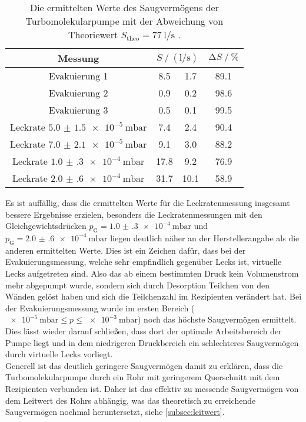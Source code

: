 \begin{table}
    \centering
    \caption{Die ermittelten Werte des Saugvermögens der Turbomolekularpumpe mit der Abweichung von Theoriewert $S_\text{theo} = \SI{77}{\litre\per\second}$ \cite{anleitung}.}
    \label{tab:compare_turbo}
    \begin{tabular}{c  S @{${}\pm{}$} S  S}
        \toprule
        {Messung} &  & {$\increment S  \mathbin{/} \si{\percent}$} \\ 
        \midrule
        Evakuierung 1                           & 8.5 & 1.7 & 89.1\\
        Evakuierung 2                           & 0.9 & 0.2 & 98.6\\
        Evakuierung 3                           & 0.5 & 0.1 & 99.5\\
        Leckrate $\SI{5.0(15)e-5}{\milli\bar}$  & 7.4 & 2.4 & 90.4\\
        Leckrate $\SI{7.0(21)e-5}{\milli\bar}$  & 9.1 & 3.0 & 88.2\\
        Leckrate $\SI{1.0(3)e-4}{\milli\bar}$   &17.8 & 9.2 & 76.9\\
        Leckrate $\SI{2.0(6)e-4}{\milli\bar}$   &31.7 &10.1 & 58.9\\
        \bottomrule
    \end{tabular}
\end{table}

\noindent Es ist auffällig, dass die ermittelten Werte für die Leckratenmessung insgesamt bessere Ergebnisse erzielen, besonders die Leckratenmessungen
mit den Gleichgewichtsdrücken $p_\text{G} = \SI{1.0(3)e-4}{\milli\bar}$ und $p_\text{G} = \SI{2.0(6)e-4}{\milli\bar}$ liegen deutlich näher an der Herstellerangabe als die anderen ermittelten Werte. 
Dies ist ein Zeichen dafür, dass bei der Evakuierungsmessung, welche sehr empfindlich gegenüber Lecks ist, virtuelle Lecks aufgetreten sind. Also das ab einem bestimmten Druck 
kein Volumenstrom mehr abgepumpt wurde, sondern sich durch Desorption Teilchen von den Wänden gelöst haben und sich die Teilchenzahl im Rezipienten verändert hat.
Bei der Evakuierungsmessung wurde im ersten Bereich ($\SI{e-5}{\milli\bar} \leq p \leq \SI{e-3}{\milli\bar}$) noch das höchste Saugvermögen ermittelt.
Dies lässt wieder darauf schließen, dass dort der optimale Arbeitsbereich der Pumpe liegt und in dem niedrigeren Druckbereich ein schlechteres Saugvermögen durch virtuelle Lecks vorliegt. \\
Generell ist das deutlich geringere Saugvermögen damit zu erklären, dass die Turbomolekularpumpe durch ein Rohr mit geringerem Querschnitt mit dem Rezipienten verbunden ist. Daher ist das 
effektiv zu messende Saugvermögen von dem Leitwert des Rohrs abhängig, was das theoretisch zu erreichende Saugvermögen nochmal heruntersetzt, siehe \autoref{subsec:leitwert}. 

